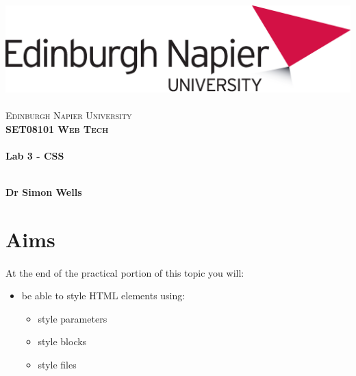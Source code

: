 \documentclass[10pt, a4paper, twosize]{article}
\begin{document}

\begin{titlepage}
\vspace*{5cm}
\begin{center}
\includegraphics[width=.5\textwidth]{images/EdNapUniLogoCMYK}~\\[1cm]

\textsc{\Large Edinburgh Napier University}\\[1.5cm]

\textsc{\LARGE \bfseries SET08101 Web Tech}\\[0.5cm]

\hrulefill \\[0.4cm]
{\huge \bfseries Lab 3 - CSS \\[0.4cm] }
\hrulefill \\[1.5cm]

\begin{minipage}{0.4\textwidth}
\begin{flushleft} \large
\textbf{Dr Simon Wells} \\
\end{flushleft}
\end{minipage}

\vfill

\end{center}
\end{titlepage}




%

\section{Aims}
\paragraph{} At the end of the practical portion of this topic you will:

\begin{itemize}
\item be able to style HTML elements using:
    \begin{itemize}
    \item style parameters
    \item style blocks
    \item style files
    \end{itemize}
\end{itemize}
\end{document}
